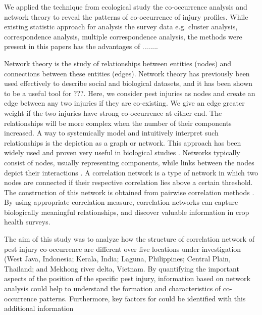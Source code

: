 We applied the technique from ecological study the co-occurrence analysis and network theory to reveal the patterns of co-occurrence of injury profiles. While existing statistic approach for analysis the survey data e.g. cluster analysis, correspondence analysis, multiple correspondence analysis, the methods were present in this papers has the advantages of ........

Network theory is the study of relationships between entities (nodes) and connections between these entities (edges). Network theory has previously been used effectively to describe social and biological datasets, and it has been shown to be a useful tool for ???. Here, we consider pest injuries as nodes and create an edge between any two injuries if they are co-existing. We give an edge greater weight if the two injuries have strong co-occurrence at either end.  The relationships will be more complex when the number of their components increased. A way to systemically model and intuitively interpret such relationships is the depiction as a graph or network. This approach has been widely used and proven very useful in biological studies \cite{Moslonka_Lefebvre_2011}. Networks typically consist of nodes, usually representing components, while links between the nodes depict their interactions \cite{Proulx_2005}. A correlation network is a type of network in which two nodes are connected if their respective correlation lies above a certain threshold. The construction of this network is obtained from pairwise correlation methods \cite{Toubiana_2013}. By using appropriate correlation measure, correlation networks can capture biologically meaningful relationships, and discover valuable information in crop health surveys.

The aim of this study was to analyze how the structure of correlation network of pest injury co-occurrence are different over five locations under investigation (West Java, Indonesia; Kerala, India; Laguna, Philippines; Central Plain, Thailand; and Mekhong river delta, Vietnam. By quantifying the important aspects of the position of the specific pest injury, information based on network analysis could help to understand the formation and characteristics of co-occurrence patterns. Furthermore, key factors for could be identified with this additional information